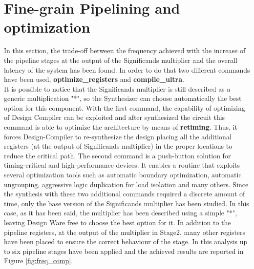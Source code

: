 \documentclass[a4paper, titlepage]{article}
\begin{document}
\section{Fine-grain Pipelining and optimization}
In this section, 
the trade-off between the frequency achieved with the increase of the pipeline stages at the output of the Significands multiplier and the overall latency of the system has been found. In order to do that two different commands 
have been used, \textbf{optimize\_registers} and \textbf{compile\_ultra}. 
\\It is possible to notice that the Significands multiplier is still described as a generic multiplication "*", so the Synthesizer can choose automatically the best option for this component.
\newline
With the first command, 
the capability of optimizing of Design Compiler can be exploited and after synthesized the circuit this command is able to optimize the architecture by means of \textbf{retiming}. Thus, it forces Design-Compiler to re-synthesize the design placing all the additional registers (at the output of Significands multiplier) in the proper locations to reduce the critical path.
\newline
The second command is a push-button solution for timing-critical and high-performance devices. It enables a routine that exploits several optimization tools such as automatic boundary optimization, automatic ungrouping, aggressive logic duplication for load isolation and many others.
\newline
Since the synthesis with these two additional commands required a discrete amount of time, only the base version of the 
Significands multiplier has been studied. In this case, as it has been said, the multiplier has been described using a simple "*", leaving Design Ware free to choose the best option for it. In addition to the pipeline registers, at the output of the multiplier in Stage2, many other registers have been placed to ensure the correct behaviour of the stage. 
\newline
In this analysis up to six pipeline stages have been applied and the achieved results are reported in Figure \ref{fig:freq_comp}.
\end{document}
